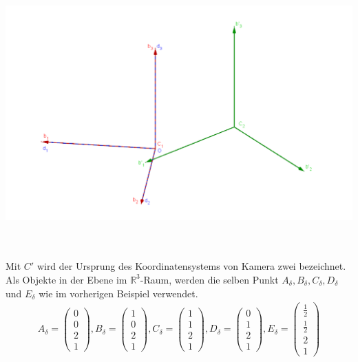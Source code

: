 \begin{minipage}{\linewidth}
	\centering
	\includegraphics[width=1.\linewidth]{images/GrafikHomographieDifferentC.png}
\end{minipage}\\ \\

Mit $C'$ wird der Ursprung des Koordinatensystems von Kamera zwei bezeichnet. Als Objekte in der Ebene im $\mathbb{R}^3$-Raum, werden die selben Punkt $A_\delta,B_\delta,C_\delta,D_\delta$ und $E_\delta$ wie im vorherigen Beispiel verwendet.\\

\begin{gather}
A_\delta=\begin{pmatrix}
0\\0\\2\\1
\end{pmatrix}, 
B_\delta=
\begin{pmatrix}
1\\0\\2\\1
\end{pmatrix},
C_\delta=
\begin{pmatrix}
1\\1\\2\\1
\end{pmatrix},
D_\delta=
\begin{pmatrix}
0\\1\\2\\1
\end{pmatrix},
E_\delta=
\begin{pmatrix}
\frac{1}{2}\\\frac{1}{2}\\2\\1
\end{pmatrix}
\end{gather}\\

